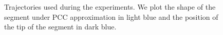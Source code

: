 \begin{figure}[hbt]
  \caption{Trajectories used during the experiments. We plot the shape of the segment under \gls{PCC} approximation in light blue and the position of the tip of the segment in dark blue. 
  }
  \label{fig:promasens:trajectories}
\end{figure}

